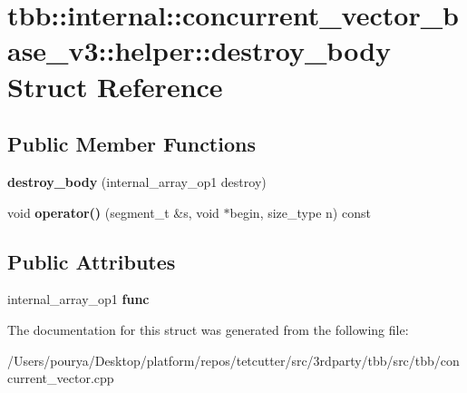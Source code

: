 \hypertarget{structtbb_1_1internal_1_1concurrent__vector__base__v3_1_1helper_1_1destroy__body}{}\section{tbb\+:\+:internal\+:\+:concurrent\+\_\+vector\+\_\+base\+\_\+v3\+:\+:helper\+:\+:destroy\+\_\+body Struct Reference}
\label{structtbb_1_1internal_1_1concurrent__vector__base__v3_1_1helper_1_1destroy__body}
\subsection*{Public Member Functions}
\begin{DoxyCompactItemize}
\item 
\hypertarget{structtbb_1_1internal_1_1concurrent__vector__base__v3_1_1helper_1_1destroy__body_a929bb87e1d48c73d8f3fcf991047a122}{}{\bfseries destroy\+\_\+body} (internal\+\_\+array\+\_\+op1 destroy)\label{structtbb_1_1internal_1_1concurrent__vector__base__v3_1_1helper_1_1destroy__body_a929bb87e1d48c73d8f3fcf991047a122}

\item 
\hypertarget{structtbb_1_1internal_1_1concurrent__vector__base__v3_1_1helper_1_1destroy__body_a4cefacd731e3db1ca3ab526de2094137}{}void {\bfseries operator()} (segment\+\_\+t \&s, void $\ast$begin, size\+\_\+type n) const \label{structtbb_1_1internal_1_1concurrent__vector__base__v3_1_1helper_1_1destroy__body_a4cefacd731e3db1ca3ab526de2094137}

\end{DoxyCompactItemize}
\subsection*{Public Attributes}
\begin{DoxyCompactItemize}
\item 
\hypertarget{structtbb_1_1internal_1_1concurrent__vector__base__v3_1_1helper_1_1destroy__body_aa6b4dd6cd53981dd09010ab0c0113d87}{}internal\+\_\+array\+\_\+op1 {\bfseries func}\label{structtbb_1_1internal_1_1concurrent__vector__base__v3_1_1helper_1_1destroy__body_aa6b4dd6cd53981dd09010ab0c0113d87}

\end{DoxyCompactItemize}


The documentation for this struct was generated from the following file\+:\begin{DoxyCompactItemize}
\item 
/\+Users/pourya/\+Desktop/platform/repos/tetcutter/src/3rdparty/tbb/src/tbb/concurrent\+\_\+vector.\+cpp\end{DoxyCompactItemize}
